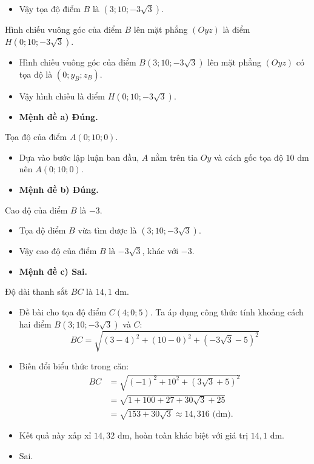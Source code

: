 \begin{ex}[]
{\begin{itemize}
			\item Vậy tọa độ điểm $B$ là $(3; 10; -3\sqrt{3})$.
		\end{itemize}
		\begin{itemchoice}
			\itemch Hình chiếu vuông góc của điểm $B$ lên mặt phẳng $(Oyz)$ là điểm $H(0;10;-3\sqrt{3})$.
			\begin{itemize}
				\item Hình chiếu vuông góc của điểm $B(3; 10; -3\sqrt{3})$ lên mặt phẳng $(Oyz)$ có tọa độ là $(0; y_B; z_B)$.
				\item Vậy hình chiếu là điểm $H(0; 10; -3\sqrt{3})$.
				\item \textbf{Mệnh đề a) Đúng.}
			\end{itemize}
			
			\itemch Tọa độ của điểm $A(0;10;0)$.
			\begin{itemize}
				\item Dựa vào bước lập luận ban đầu, $A$ nằm trên tia $Oy$ và cách gốc tọa độ $10$ dm nên $A(0; 10; 0)$.
				\item \textbf{Mệnh đề b) Đúng.}
			\end{itemize}
			
			\itemch Cao độ của điểm $B$ là $-3$.
			\begin{itemize}
				\item Tọa độ điểm $B$ vừa tìm được là $(3; 10; -3\sqrt{3})$.
				\item Vậy cao độ của điểm $B$ là $-3\sqrt{3}$, khác với $-3$.
				\item \textbf{Mệnh đề c) Sai.}
			\end{itemize}
			
			\itemch Độ dài thanh sắt $BC$ là $14,1$ dm.
			\begin{itemize}
				\item Đề bài cho tọa độ điểm $C(4; 0; 5)$. Ta áp dụng công thức tính khoảng cách hai điểm $B(3; 10; -3\sqrt{3})$ và $C$:
				$$BC = \sqrt{(3-4)^2 + (10-0)^2 + (-3\sqrt{3}-5)^2}$$
				\item Biến đổi biểu thức trong căn:
				\begin{align*}
					BC &= \sqrt{(-1)^2 + 10^2 + (3\sqrt{3}+5)^2} \\
					&= \sqrt{1 + 100 + 27 + 30\sqrt{3} + 25} \\
					&= \sqrt{153 + 30\sqrt{3}} \approx 14{,}316 \text{ (dm).}
				\end{align*}
				\item Kết quả này xấp xỉ $14{,}32$ dm, hoàn toàn khác biệt với giá trị $14{,}1$ dm.
				\item Sai.
			\end{itemize}
		\end{itemchoice}
	}
\end{ex}

